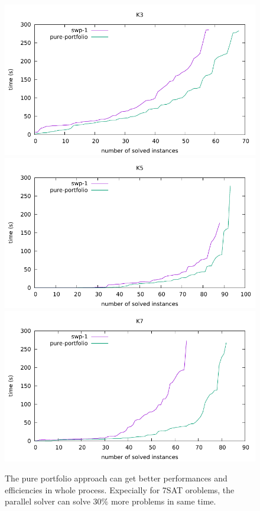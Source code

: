 \documentclass[12pt,a4paper,twoside]{scrartcl}
\numberwithin{equation}{section}
\begin{document}
  \begin{figure}[H]
\begin{center}
  \includegraphics[scale = 1]{Parallel/K3/e1.pdf}
    \includegraphics[scale = 1]{Parallel/K5/e1.pdf}
  \includegraphics[scale = 1]{Parallel/K7/e1.pdf}
  \end{center}
    \label{Experiment 5 all cactus plot}
    \caption{The pure portfolio approach can get better performances and efficiencies in whole process. Expecially for 7SAT oroblems, the parallel solver  can solve $30\%$ more problems in same time. }
  \end{figure}
  \clearpage
\end{document}
